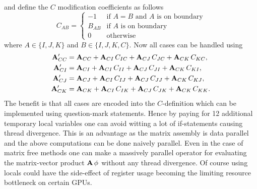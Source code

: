 \documentclass[preprint,nocopyrightspace]{sigplanconf}
\begin{document}
and define the $C$ modification coefficients as follows
\begin{equation}
  \label{eq:modification:}
  C_{AB} =
  \begin{cases}
    -1 & \text{if $A=B$ and $A$ is on boundary} \\
    B_{AB} & \text{if $A$ is on boundary} \\
    0 & \text{otherwise} 
\end{cases}
\end{equation}
where $A \in \{I,J,K\}$ and $B \in \{I,J,K,C\}$. Now all cases can be handled using
\begin{subequations}
  \begin{align}
    \mathbf{A} ^\prime_{CC} &= \mathbf{A} _{CC}  + \mathbf{A} _{CI} \,  C_{IC}+ \mathbf{A} _{CJ} \,  C_{JC}+ \mathbf{A} _{CK} \,  C_{KC}, \\
    \mathbf{A} ^\prime_{CI} &= \mathbf{A} _{CI}  + \mathbf{A} _{CI} \,  C_{II} + \mathbf{A} _{CJ} \,  C_{JI}+ \mathbf{A} _{CK} \,  C_{KI}, \\
    \mathbf{A} ^\prime_{CJ} &= \mathbf{A} _{CJ}  + \mathbf{A} _{CI} \,  C_{IJ} + \mathbf{A} _{CJ} \,  C_{JJ}+ \mathbf{A} _{CK} \,  C_{KJ}, \\
    \mathbf{A} ^\prime_{CK} &= \mathbf{A} _{CK}  + \mathbf{A} _{CI} \,  C_{IK} + \mathbf{A} _{CJ} \,  C_{JK} + \mathbf{A} _{CK} \,  C_{KK}.
  \end{align}  
\end{subequations}
The benefit is that all cases are encoded into the $C$-definition
which can be implemented using question-mark statements. Hence by
paying for 12 additional temporary local variables one can avoid
witting a lot of if-statements causing thread divergence. This is an
advantage as the matrix assembly is data parallel and the above
computations can be done naively parallel. Even in the case of matrix
free methods one can make a massively parallel operator for evaluating
the matrix-vector product $\mathbf{A}  \, \mathbf{\phi} $ without any thread
divergence. Of course using locals could have the side-effect of
register usage becoming the limiting resource bottleneck on certain
GPUs.



\appendix
\end{document}
